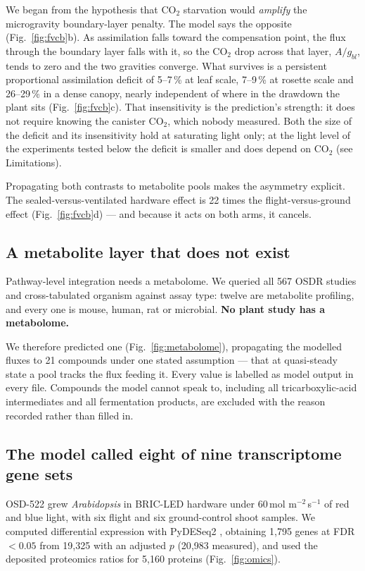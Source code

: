 \documentclass[pdflatex,sn-nature]{sn-jnl}
\begin{document}
We began from the hypothesis that CO$_2$ starvation would \emph{amplify} the microgravity
boundary-layer penalty. The model says the opposite (Fig.~\ref{fig:fvcb}b). As assimilation
falls toward the compensation point, the flux through the boundary layer falls with it, so
the CO$_2$ drop across that layer, $A/g_{bl}$, tends to zero and the two gravities converge.
What survives is a persistent proportional assimilation deficit of 5--7\,\% at leaf scale,
7--9\,\% at rosette scale and 26--29\,\% in a dense canopy, nearly independent of where in the
drawdown the plant sits (Fig.~\ref{fig:fvcb}c). That insensitivity is the prediction's
strength: it does not require knowing the canister CO$_2$, which nobody measured. Both the
size of the deficit and its insensitivity hold at saturating light only; at the light level
of the experiments tested below the deficit is smaller and does depend on CO$_2$ (see
Limitations).

Propagating both contrasts to metabolite pools makes the asymmetry explicit. The
sealed-versus-ventilated hardware effect is 22 times the flight-versus-ground effect
(Fig.~\ref{fig:fvcb}d) --- and because it acts on both arms, it cancels.

\subsection{A metabolite layer that does not exist}

Pathway-level integration needs a metabolome. We queried all 567 OSDR studies and
cross-tabulated organism against assay type: twelve are metabolite profiling, and every one
is mouse, human, rat or microbial. \textbf{No plant study has a metabolome.}

We therefore predicted one (Fig.~\ref{fig:metabolome}), propagating the modelled fluxes to 21
compounds under one stated assumption --- that at quasi-steady state a pool tracks the flux
feeding it. Every value is labelled as model output in every file. Compounds the model cannot
speak to, including all tricarboxylic-acid intermediates and all fermentation products, are
excluded with the reason recorded rather than filled in.

\subsection{The model called eight of nine transcriptome gene sets}

OSD-522 \citep{osd522} grew \textit{Arabidopsis} in BRIC-LED hardware under 60\,\textmu mol
m$^{-2}$\,s$^{-1}$ of red and blue light, with six flight and six ground-control shoot
samples. We computed differential expression with PyDESeq2 \citep{pydeseq2}, obtaining 1{,}795
genes at FDR $<0.05$ from 19{,}325 with an adjusted $p$ (20{,}983 measured), and used the deposited proteomics ratios for 5{,}160
proteins (Fig.~\ref{fig:omics}).
\end{document}
